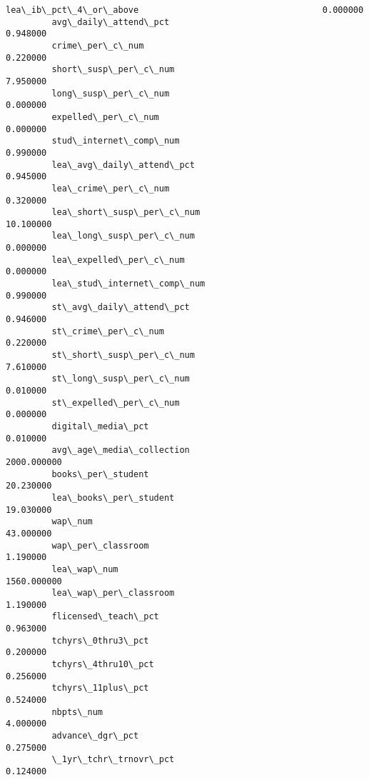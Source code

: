 \documentclass[11pt]{article}
\begin{document}
\begin{Verbatim}[commandchars=\\\{\}]
         lea\_ib\_pct\_4\_or\_above                                    0.000000   
         avg\_daily\_attend\_pct                                     0.948000   
         crime\_per\_c\_num                                          0.220000   
         short\_susp\_per\_c\_num                                     7.950000   
         long\_susp\_per\_c\_num                                      0.000000   
         expelled\_per\_c\_num                                       0.000000   
         stud\_internet\_comp\_num                                   0.990000   
         lea\_avg\_daily\_attend\_pct                                 0.945000   
         lea\_crime\_per\_c\_num                                      0.320000   
         lea\_short\_susp\_per\_c\_num                                10.100000   
         lea\_long\_susp\_per\_c\_num                                  0.000000   
         lea\_expelled\_per\_c\_num                                   0.000000   
         lea\_stud\_internet\_comp\_num                               0.990000   
         st\_avg\_daily\_attend\_pct                                  0.946000   
         st\_crime\_per\_c\_num                                       0.220000   
         st\_short\_susp\_per\_c\_num                                  7.610000   
         st\_long\_susp\_per\_c\_num                                   0.010000   
         st\_expelled\_per\_c\_num                                    0.000000   
         digital\_media\_pct                                        0.010000   
         avg\_age\_media\_collection                              2000.000000   
         books\_per\_student                                       20.230000   
         lea\_books\_per\_student                                   19.030000   
         wap\_num                                                 43.000000   
         wap\_per\_classroom                                        1.190000   
         lea\_wap\_num                                           1560.000000   
         lea\_wap\_per\_classroom                                    1.190000   
         flicensed\_teach\_pct                                      0.963000   
         tchyrs\_0thru3\_pct                                        0.200000   
         tchyrs\_4thru10\_pct                                       0.256000   
         tchyrs\_11plus\_pct                                        0.524000   
         nbpts\_num                                                4.000000   
         advance\_dgr\_pct                                          0.275000   
         \_1yr\_tchr\_trnovr\_pct                                     0.124000   

\end{Verbatim}
\end{document}
